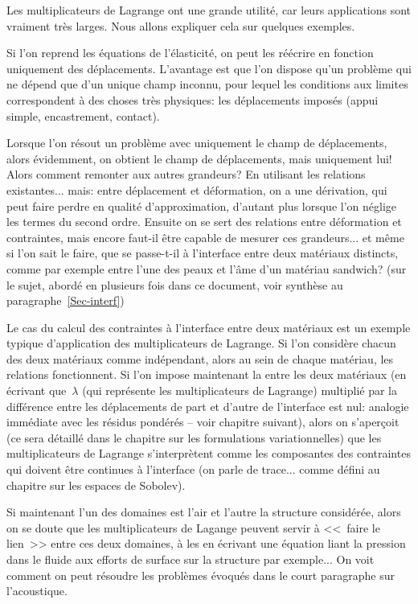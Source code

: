 Les multiplicateurs de Lagrange ont une grande utilité, car leurs applications sont
vraiment très larges.
Nous allons expliquer cela sur quelques exemples.

\medskip
Si l'on reprend les équations de l'élasticité, on peut les réécrire en fonction
uniquement des déplacements.
L'avantage est que l'on dispose qu'un problème qui ne dépend que d'un unique
champ inconnu, pour lequel les conditions aux limites correspondent à des choses 
très physiques: les déplacements imposés (appui simple, encastrement, contact).

Lorsque l'on résout un problème avec uniquement le champ de déplacements,
alors évidemment, on obtient le champ de déplacements, mais uniquement lui!
Alors comment remonter aux autres grandeurs? En utilisant les relations
existantes... mais: entre déplacement et déformation, on a une dérivation,
qui peut faire perdre en qualité d'approximation, d'autant plus lorsque l'on
néglige les termes du second ordre.
Ensuite on se sert des relations entre déformation et contraintes, mais encore
faut-il être capable de mesurer ces grandeurs... et même si l'on sait le faire,
que se passe-t-il à l'interface entre deux matériaux distincts, comme par exemple
entre l'une des peaux et l'âme d'un matériau sandwich? (sur le sujet, abordé en
plusieurs fois dans ce document, voir synthèse au paragraphe~\ref{Sec-interf})

\medskip
Le cas du calcul des contraintes à l'interface entre deux matériaux est un exemple
typique d'application des multiplicateurs de Lagrange.
Si l'on considère chacun des deux matériaux comme indépendant, alors au sein
de chaque matériau, les relations fonctionnent.
Si l'on impose maintenant la  
entre les deux matériaux (en écrivant que~$\lambda$ (qui représente les multiplicateurs de Lagrange)
multiplié par la différence entre les déplacements de part et d'autre de l'interface est nul: analogie
immédiate avec les résidus pondérés -- voir chapitre suivant), 
alors on s'aperçoit (ce sera détaillé dans le chapitre sur les 
formulations variationnelles) que les multiplicateurs de Lagrange s'interprètent comme
les composantes des contraintes qui doivent être continues à l'interface (on parle
de trace... comme défini au chapitre sur les espaces de Sobolev).

\medskip
Si maintenant l'un des domaines est l'air et l'autre la structure considérée, alors
on se doute que les multiplicateurs de Lagange peuvent servir à <<~faire le lien~>> 
entre ces deux domaines, à les  en écrivant une équation
liant la pression dans le fluide aux efforts de surface sur la structure par exemple...
On voit comment on peut résoudre les problèmes évoqués dans le court paragraphe 
sur l'acoustique.

